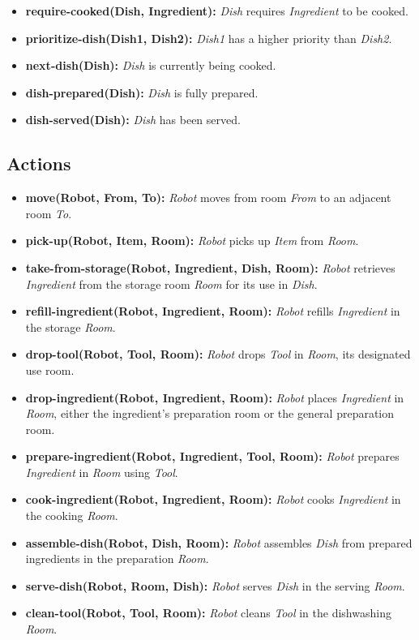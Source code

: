\documentclass{article}
\begin{document}
\begin{itemize}[label=--, itemsep=0.05em]
    \item \textbf{require-cooked(Dish, Ingredient):} \textit{Dish} requires \textit{Ingredient} to be cooked.
    \item \textbf{prioritize-dish(Dish1, Dish2):} \textit{Dish1} has a higher priority than \textit{Dish2}.
    \item \textbf{next-dish(Dish):} \textit{Dish} is currently being cooked.
    \item \textbf{dish-prepared(Dish):} \textit{Dish} is fully prepared.
    \item \textbf{dish-served(Dish):} \textit{Dish} has been served.
    
\end{itemize}

\subsection{Actions}\label{sec:act}

\begin{itemize}[label=--, itemsep=0.05em]
    \item \textbf{move(Robot, From, To):} \textit{Robot} moves from room \textit{From} to an adjacent room \textit{To}.
    \item \textbf{pick-up(Robot, Item, Room):} \textit{Robot} picks up \textit{Item} from \textit{Room}.
    \item \textbf{take-from-storage(Robot, Ingredient, Dish, Room):} \textit{Robot} retrieves \textit{Ingredient} from the storage room \textit{Room} for its use in \textit{Dish}.
    \item \textbf{refill-ingredient(Robot, Ingredient, Room):} \textit{Robot} refills \textit{Ingredient} in the storage \textit{Room}.
    \item \textbf{drop-tool(Robot, Tool, Room):} \textit{Robot} drops \textit{Tool} in \textit{Room}, its designated use room.
    \item \textbf{drop-ingredient(Robot, Ingredient, Room):} \textit{Robot} places \textit{Ingredient} in \textit{Room}, either the ingredient's preparation room or the general preparation room.
    \item \textbf{prepare-ingredient(Robot, Ingredient, Tool, Room):} \textit{Robot} prepares \textit{Ingredient} in \textit{Room} using \textit{Tool}.
    \item \textbf{cook-ingredient(Robot, Ingredient, Room):} \textit{Robot} cooks \textit{Ingredient} in the cooking \textit{Room}.
    \item \textbf{assemble-dish(Robot, Dish, Room):} \textit{Robot} assembles \textit{Dish} from prepared ingredients in the preparation \textit{Room}.
    \item \textbf{serve-dish(Robot, Room, Dish):} \textit{Robot} serves \textit{Dish} in the serving \textit{Room}.
    \item \textbf{clean-tool(Robot, Tool, Room):} \textit{Robot} cleans \textit{Tool} in the dishwashing \textit{Room}.
    \end{itemize}
\end{document}
